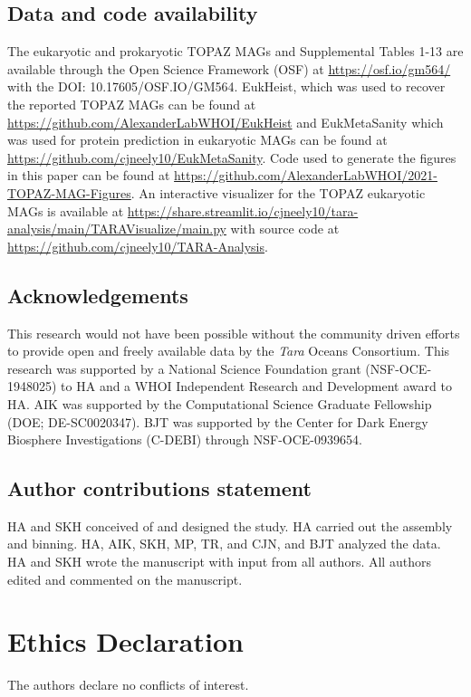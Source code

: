 \documentclass[12pt]{article}
\numberwithin{equation}{section}
\begin{document}
\subsection*{Data and code availability}
The eukaryotic and prokaryotic TOPAZ MAGs and Supplemental Tables 1-13 are available through the Open Science Framework (OSF) at \url{https://osf.io/gm564/} with the DOI: 10.17605/OSF.IO/GM564. EukHeist, which was used to recover the reported TOPAZ MAGs can be found at \url{https://github.com/AlexanderLabWHOI/EukHeist} and EukMetaSanity which was used for protein prediction in eukaryotic MAGs can be found at \url{https://github.com/cjneely10/EukMetaSanity}. Code used to generate the figures in this paper can be found at \url{https://github.com/AlexanderLabWHOI/2021-TOPAZ-MAG-Figures}. An interactive visualizer for the TOPAZ eukaryotic MAGs is available at \url{https://share.streamlit.io/cjneely10/tara-analysis/main/TARAVisualize/main.py} with source code at \url{https://github.com/cjneely10/TARA-Analysis}. 

\subsection*{Acknowledgements}
This research would not have been possible without the community driven efforts to provide open and freely available data by the \textit{Tara} Oceans Consortium. This research was supported by a National Science Foundation grant (NSF-OCE-1948025) to HA and a WHOI Independent Research and Development award to HA. AIK was supported by the Computational Science Graduate Fellowship (DOE; DE-SC0020347). BJT was supported by the Center for Dark Energy Biosphere Investigations (C-DEBI) through NSF-OCE-0939654. 

\subsection*{Author contributions statement}
HA and SKH conceived of and designed the study. HA carried out the assembly and binning. HA, AIK, SKH, MP, TR, and CJN, and BJT analyzed the data. HA and SKH wrote the manuscript with input from all authors. All authors edited and commented on the manuscript.

\section*{Ethics Declaration}
The authors declare no conflicts of interest.



\end{document}
